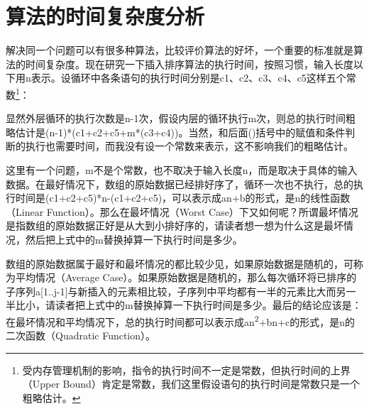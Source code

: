 


\section{算法的时间复杂度分析}
%
解决同一个问题可以有很多种算法，比较评价算法的好坏，一个重要的标准就是算法的时间复杂度。现在研究一下插入排序算法的执行时间，按照习惯，输入长度以下用n表示。设循环中各条语句的执行时间分别是c1、c2、c3、c4、c5这样五个常数\footnote[23]{受内存管理机制的影响，指令的执行时间不一定是常数，但执行时间的上界（Upper Bound）肯定是常数，我们这里假设语句的执行时间是常数只是一个粗略估计。}：




显然外层循环的执行次数是n-1次，假设内层的循环执行m次，则总的执行时间粗略估计是(n-1)*(c1+\BookSplit{}c2+\BookSplit{}c5+\BookSplit{}m*\BookSplit{}(c3+\BookSplit{}c4))。当然，和后面()括号中的赋值和条件判断的执行也需要时间，而我没有设一个常数来表示，这不影响我们的粗略估计。



这里有一个问题，m不是个常数，也不取决于输入长度n，而是取决于具体的输入数据。在最好情况下，数组的原始数据已经排好序了，循环一次也不执行，总的执行时间是(c1+\BookSplit{}c2+\BookSplit{}c5)*n-(c1+\BookSplit{}c2+\BookSplit{}c5)，可以表示成an+\BookSplit{}b的形式，是n的线性函数（Linear Function）。那么在最坏情况（Worst Case）下又如何呢？所谓最坏情况是指数组的原始数据正好是从大到小排好序的，请读者想一想为什么这是最坏情况，然后把上式中的m替换掉算一下执行时间是多少。



数组的原始数据属于最好和最坏情况的都比较少见，如果原始数据是随机的，可称为平均情况（Average Case）。如果原始数据是随机的，那么每次循环将已排序的子序列a[1.\BookSplit{}.\BookSplit{}j-1]与新插入的元素相比较，子序列中平均都有一半的元素比大而另一半比小，请读者把上式中的m替换掉算一下执行时间是多少。最后的结论应该是：在最坏情况和平均情况下，总的执行时间都可以表示成an\textsuperscript{2}+bn+\BookSplit{}c的形式，是n的二次函数（Quadratic Function）。



